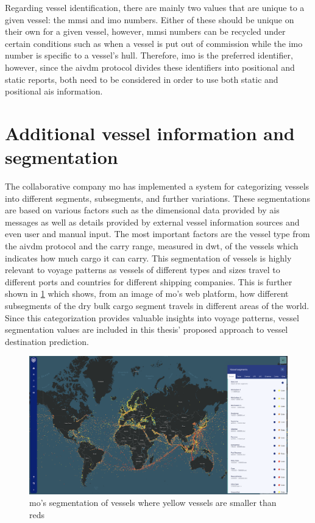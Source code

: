 Regarding vessel identification, there are mainly two values that are unique to a given vessel: the \acrshort{mmsi} and \acrshort{imo} numbers. Either of these should be unique on their own for a given vessel, however, \acrshort{mmsi} numbers can be recycled under certain conditions such as when a vessel is put out of commission while the \acrshort{imo} number is specific to a vessel's hull. Therefore, \acrshort{imo} is the preferred identifier, however, since the \gls{aivdm} protocol divides these identifiers into positional and static reports, both need to be considered in order to use both static and positional \acrshort{ais} information.

\section{Additional vessel information and segmentation}

The collaborative company \acrfull{mo} has implemented a system for categorizing vessels into different segments, subsegments, and further variations. These segmentations are based on various factors such as the dimensional data provided by \acrshort{ais} messages as well as details provided by external vessel information sources and even user and manual input. The most important factors are the vessel type from the \gls{aivdm} protocol and the carry range, measured in \acrshort{dwt}, of the vessels which indicates how much cargo it can carry. This segmentation of vessels is highly relevant to voyage patterns as vessels of different types and sizes travel to different ports and countries for different shipping companies. This is further shown in \cref{fig:segment_map} which shows, from an image of \acrshort{mo}'s web platform, how different subsegments of the dry bulk cargo segment travels in different areas of the world. Since this categorization provides valuable insights into voyage patterns, vessel segmentation values are included in this thesis' proposed approach to vessel destination prediction.

\begin{figure}[htbp]  %
    \centering
    \includegraphics[width=1.0\textwidth]{figures/segment_map}
    \caption{\acrfull{mo}’s segmentation of vessels where yellow vessels are smaller than reds}
    \label{fig:segment_map}
\end{figure}

